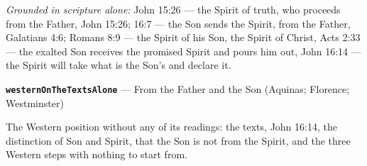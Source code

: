 \documentclass[11pt,paper=\testimonypaper,DIV=13,parskip=false]{scrartcl}
\begin{document}
\emph{Grounded in scripture alone:} John 15:26 — the Spirit of truth, who proceeds from the Father, John 15:26; 16:7 — the Son sends the Spirit, from the Father, Galatians 4:6; Romans 8:9 — the Spirit of his Son, the Spirit of Christ, Acts 2:33 — the exalted Son receives the promised Spirit and pours him out, John 16:14 — the Spirit will take what is the Son’s and declare it.
\par\medskip\noindent\textbf{\texttt{western\allowbreak{}On\allowbreak{}The\allowbreak{}Texts\allowbreak{}Alone}} --- From the Father and the Son (Aquinas; Florence; Westminster)\par\nobreak\noindent
The Western position without any of its readings: the texts, John 16:14, the distinction of Son and Spirit, that the Son is not from the Spirit, and the three Western steps with nothing to start from.
\end{document}
